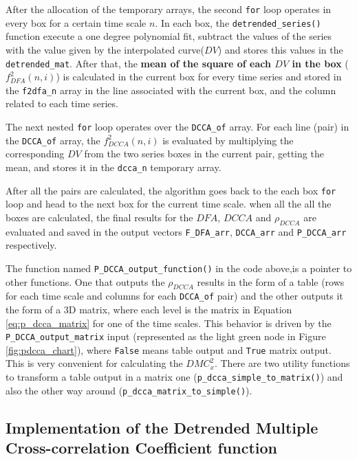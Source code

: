 \documentclass[article]{jss}
\begin{document}
After the allocation of the temporary arrays, the second \verb"for" loop operates in every box for a certain time scale $n$. In each box, the \verb"detrended_series()" function execute a one degree polynomial fit, subtract the values of the series with the value given by the interpolated curve($DV$) and stores this values in the \verb"detrended_mat". After that, the \textbf{mean of the square of each $DV$ in the box} ($f_{DFA}^{2}(n, i)$) is calculated in the current box for every time series and stored in the \verb"f2dfa_n" array in the line associated with the current box, and the column related to each time series.

The next nested \verb"for" loop operates over the \verb"DCCA_of" array. For each line (pair) in the \verb"DCCA_of" array, the $f_{DCCA}^{2}(n, i)$ is evaluated by multiplying the corresponding $DV$ from the two series  boxes in the current pair, getting the mean, and stores it in the \verb"dcca_n" temporary array.

After all the pairs are calculated, the algorithm goes back to the each box \verb"for" loop and head to the next box for the current time scale. when all the all the boxes are calculated, the final results for the $DFA$, $DCCA$ and $\rho_{DCCA}$ are evaluated and saved in the output vectors \verb"F_DFA_arr", \verb"DCCA_arr" and \verb"P_DCCA_arr" respectively.

The function named \verb"P_DCCA_output_function()" in the code above,is a pointer to other functions. One that outputs the  $\rho_{DCCA}$ results in the form of a table (rows for each time scale and columns for each \verb"DCCA_of" pair) and the other outputs it the form of a 3D matrix, where each level is the matrix in Equation \ref{eq:p_dcca_matrix} for one of the time scales. This behavior is driven by the \verb"P_DCCA_output_matrix" input (represented as the light green node in Figure \ref{fig:pdcca_chart}), where \verb"False" means table output and \verb"True" matrix output. This is very convenient for calculating the $DMC_x^2$. There are two utility functions to transform a table output in a matrix one (\verb"p_dcca_simple_to_matrix()") and also the other way around (\verb"p_dcca_matrix_to_simple()").

\subsection{Implementation of the Detrended Multiple Cross-correlation Coefficient function}
\end{document}
